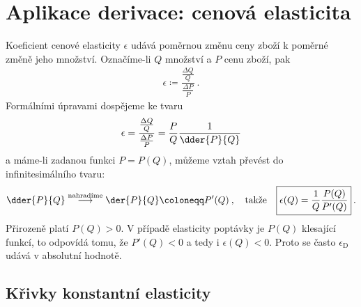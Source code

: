 \section{Aplikace derivace: cenová elasticita}

Koeficient cenové elasticity $\epsilon$ udává poměrnou změnu ceny zboží k poměrné změně jeho množství. Označíme-li $Q$ množství a $P$ cenu zboží, pak 
\begin{align}
    \epsilon \coloneqq \dfrac{\frac{\Delta Q}{Q}}{ \frac{\Delta P}{P} } \:.
\end{align}
Formálními úpravami dospějeme ke tvaru
\begin{align}
    \epsilon = \dfrac{\frac{\Delta Q}{Q}}{ \frac{\Delta P}{P} }
    = \frac{P}{Q} \dfrac{1}{\dder{P}{Q}}
\end{align}
a máme-li zadanou funkci $P=P(Q)$, můžeme vztah převést do infinitesimálního tvaru:
\begin{align}
    \dder{P}{Q} \overset{\text{nahradíme}} \longrightarrow \der{P}{Q} \coloneqq P'(Q) \:, \quad \text{takže} \quad
    \boxed{
        \epsilon(Q) = \frac{1}{Q} \dfrac{P(Q)}{P'(Q)} \label{eq:epsilon}
    } \:.
\end{align}
Přirozeně platí $P(Q)>0$. V případě elasticity poptávky je $P(Q)$ klesající funkcí, to odpovídá tomu, že $P'(Q)<0$ a tedy i $\epsilon(Q) < 0$. Proto se často $\epsilon_{\mathrm{D}}$ udává v absolutní hodnotě.

\subsection{Křivky konstantní elasticity}

